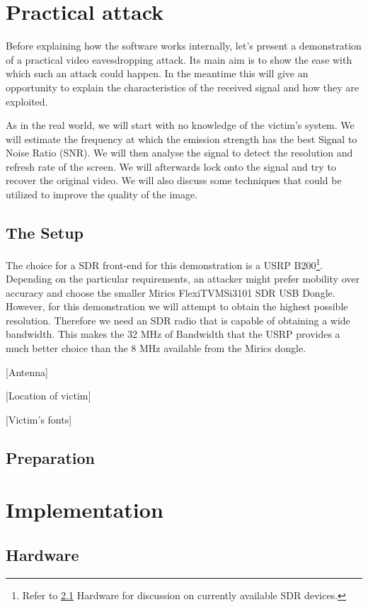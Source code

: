 \documentclass[a4paper,12pt,twoside,openright]{report}
\begin{document}
\chapter{Practical attack} 

Before explaining how the software works internally, let's present a demonstration of a practical video eavesdropping attack. Its main aim is to show the ease with which such an attack could happen. In the meantime this will give an opportunity to explain the characteristics of the received signal and how they are exploited.

As in the real world, we will start with no knowledge of the victim's system. We will estimate the frequency at which the emission strength has the best Signal to Noise Ratio (SNR). We will then analyse the signal to detect the resolution and refresh rate of the screen. We will afterwards lock onto the signal and try to recover the original video. We will also discuss some techniques that could be utilized to improve the quality of the image.

\section{The Setup}

The choice for a SDR front-end for this demonstration is a USRP B200\footnote{Refer to \ref{sec:hw} Hardware for discussion on currently available SDR devices.}. Depending on the particular requirements, an attacker might prefer mobility over accuracy and choose the smaller Mirics FlexiTV\texttrademark MSi3101 SDR USB Dongle. However, for this demonstration we will attempt to obtain the highest possible resolution. Therefore we need an SDR radio that is capable of obtaining a wide bandwidth. This makes the 32 MHz of Bandwidth that the USRP provides a much better choice than the 8 MHz available from the Mirics dongle.

[Antenna]

[Location of victim]

[Victim's fonts]

\section{Preparation}

\chapter{Implementation} 

\section{Hardware}
\label{sec:hw} 
\end{document}
